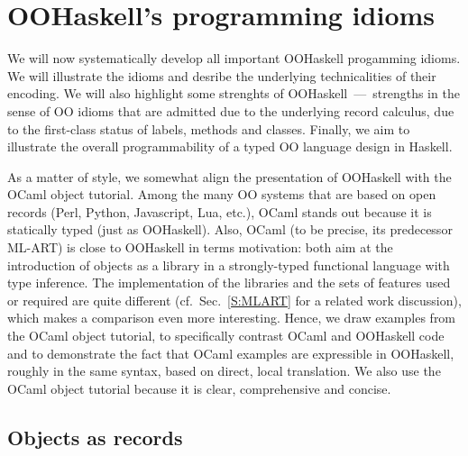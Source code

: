 \documentclass{jfp}
\begin{document}



\section{OOHaskell's programming idioms}
\label{S:OOHaskell}

We will now systematically develop all important OOHaskell progamming
idioms. We will illustrate the idioms and desribe the underlying
technicalities of their encoding. We will also highlight some
strenghts of OOHaskell~---~strengths in the sense of OO idioms that
are admitted due to the underlying record calculus, due to the
first-class status of labels, methods and classes. Finally, we aim to
illustrate the overall programmability of a typed OO language design
in Haskell.

As a matter of style, we somewhat align the presentation of OOHaskell
with the OCaml object tutorial. Among the many OO systems that are
based on open records (Perl, Python, Javascript, Lua, etc.), OCaml
stands out because it is statically typed (just as OOHaskell). Also,
OCaml (to be precise, its predecessor {ML-ART}) is close to OOHaskell
in terms motivation: both aim at the introduction of objects as a
library in a strongly-typed functional language with type
inference. The implementation of the libraries and the sets of
features used or required are quite different (cf.\ Sec.~\ref{S:MLART}
for a related work discussion), which makes a comparison even more
interesting. Hence, we draw examples from the OCaml object tutorial,
to specifically contrast OCaml and OOHaskell code and to demonstrate
the fact that OCaml examples are expressible in OOHaskell, roughly in
the same syntax, based on direct, local translation. We also use the
OCaml object tutorial because it is clear, comprehensive and concise.






\subsection{Objects as records}
\end{document}
